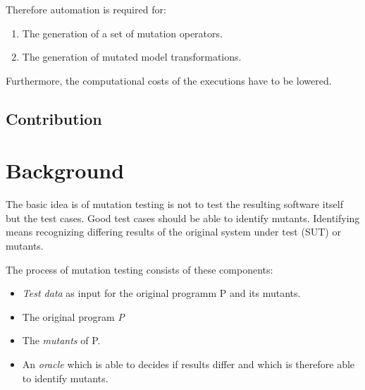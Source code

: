 \documentclass{llncs}
\begin{document}
Therefore automation is required for:

\begin{enumerate}
	\item The generation of a set of mutation operators.
	\item The generation of mutated model transformations.
\end{enumerate}

Furthermore, the computational costs of the executions have to be lowered.

\subsection{Contribution}



\section{Background}

The basic idea is of mutation testing is not to test the resulting software itself but the test cases. Good test cases should be able to identify mutants. Identifying means recognizing differing results of the original system under test (SUT) or mutants.\cite{MatMottu2006}

The process of mutation testing consists of these components:
\begin{itemize}
	\item \textit{Test data} as input for the original programm P and its mutants.
	\item The original program \textit{P}
	\item The \textit{mutants} of P.
	\item An \textit{oracle} which is able to decides if results differ and which is therefore able to identify mutants.
\end{itemize}
\end{document}
